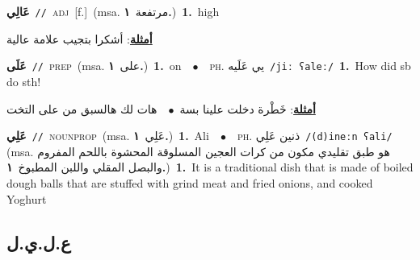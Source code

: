\documentclass[10pt,a4paper,twoside]{article} %
\begin{document}
\begin{multicols}{2}
{\setlength\topsep{0pt}\textbf{\foreignlanguage{arabic}{عَالِي}}\ {\color{gray}\texttt{//}\color{black}}\ \textsc{adj}\ [f.]\ \color{gray}(msa. \foreignlanguage{arabic}{مرتفعة}~\foreignlanguage{arabic}{\textbf{١.}})\color{black}\ \textbf{1.}~high\  \begin{flushright}\color{gray}\foreignlanguage{arabic}{\textbf{\underline{\foreignlanguage{arabic}{أمثلة}}}: أشكرا بتجيب علامة عالية}\end{flushright}\color{black}} \vspace{2mm}

{\setlength\topsep{0pt}\textbf{\foreignlanguage{arabic}{عَلَى}}\ {\color{gray}\texttt{//}\color{black}}\ \textsc{prep}\ \color{gray}(msa. \foreignlanguage{arabic}{على}~\foreignlanguage{arabic}{\textbf{١.}})\color{black}\ \textbf{1.}~on\ \ $\bullet$\ \ \textsc{ph.} \color{gray} \foreignlanguage{arabic}{يي عَلَيه}\color{black}\ {\color{gray}\texttt{/{\sffamily jiː ʕaleː}/}\color{black}}\ \textbf{1.}~How did sb do sth!\  \begin{flushright}\color{gray}\foreignlanguage{arabic}{\textbf{\underline{\foreignlanguage{arabic}{أمثلة}}}: خَطْرة دخلت علينا بسة\ $\bullet$\ \  هات لك هالسبق من على التخت}\end{flushright}\color{black}} \vspace{2mm}

{\setlength\topsep{0pt}\textbf{\foreignlanguage{arabic}{عَلِي}}\ {\color{gray}\texttt{//}\color{black}}\ \textsc{noun\textunderscore prop}\ \color{gray}(msa. \foreignlanguage{arabic}{عَلِي}~\foreignlanguage{arabic}{\textbf{١.}})\color{black}\ \textbf{1.}~Ali\ \ $\bullet$\ \ \textsc{ph.} \color{gray} \foreignlanguage{arabic}{ذنين عَلِي}\color{black}\ {\color{gray}\texttt{/{\sffamily (d)ineːn ʕali}/}\color{black}}\ \color{gray} (msa. \foreignlanguage{arabic}{هو طبق تقليدي مكون من كرات العجين المسلوقة المحشوة باللحم المفروم والبصل المقلي واللبن المطبوخ}~\foreignlanguage{arabic}{\textbf{١.}})\color{black}\ \textbf{1.}~It is a traditional dish that is made of boiled dough balls that are stuffed with grind meat and fried onions, and cooked Yoghurt\ } \vspace{2mm}

\vspace{-3mm}
\subsection*{\color{blue}\foreignlanguage{arabic}{ع.ل.ي.ل}\color{blue}{ (ntws)}} 


\end{multicols}
\end{document}
